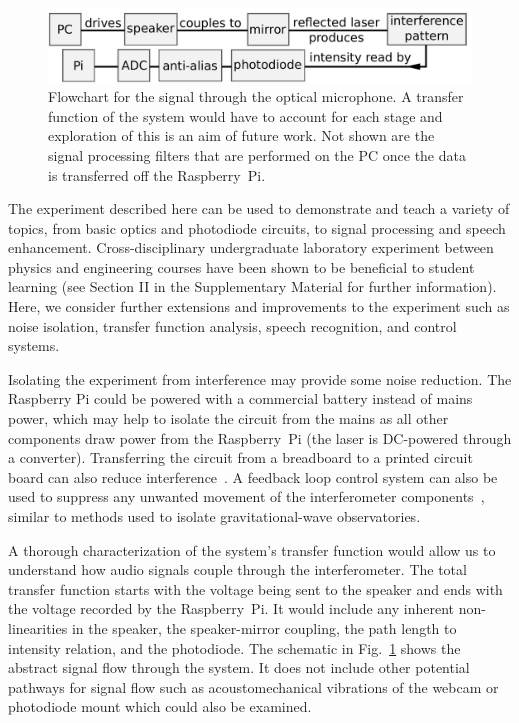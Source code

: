 \documentclass[paper-main.tex]{subfiles}
\begin{document}
\begin{figure}
    \includegraphics[width=.8\textwidth]{figures/pipeline_nobox.pdf}
	\caption{\label{fig:pipeline_highlighted}
Flowchart for the signal through the optical microphone. 
A transfer function of the system would have to account for each stage and exploration of this is an aim of future work. 
Not shown are the signal processing filters that are performed on the PC once the data is transferred off the Raspberry~Pi.
}
\end{figure}

The experiment described here can be used to demonstrate and teach a variety of topics, from basic optics and photodiode circuits, to signal processing and speech enhancement. 
Cross-disciplinary undergraduate laboratory experiment between physics and engineering courses have been shown to be beneficial to student learning (see Section II in the Supplementary Material for further information). 
Here, we consider further extensions and improvements to the experiment such as noise isolation, transfer function analysis, speech recognition, and control systems.



Isolating the experiment from interference may provide some noise reduction. 
The Raspberry Pi could be powered with a commercial battery instead of mains power, which may help to isolate the circuit from the mains as all other components draw power from the Raspberry~Pi (the laser is DC-powered through a converter).
Transferring the circuit from a breadboard to a printed circuit board can also reduce interference~\cite{elfekey2013design}.
A feedback loop control system can also be used to suppress any unwanted movement of the interferometer components~\citep{abbott2017exploring, Sekiguchi:2016bmv, verhoeven2009robust}, similar to methods used to isolate gravitational-wave observatories. 


A thorough characterization of the system's transfer function would allow us to understand how audio signals couple through the interferometer. 
The total transfer function starts with the voltage being sent to the speaker and ends with the voltage recorded by the Raspberry~Pi. 
It would include any inherent non-linearities in the speaker, the speaker-mirror coupling, the path length to intensity relation, and the photodiode. 
The schematic in Fig.~\ref{fig:pipeline_highlighted} shows the abstract signal flow through the system.
It does not include other potential pathways for signal flow such as acoustomechanical vibrations of the webcam or photodiode mount which could also be examined.
\end{document}
